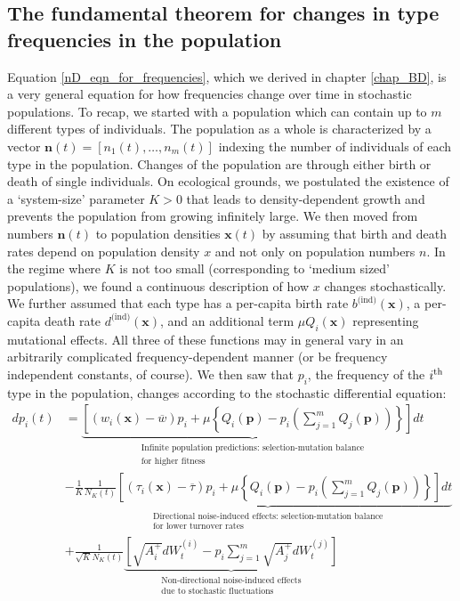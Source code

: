 \subsection{The fundamental theorem for changes in type frequencies in the population}\label{sec_fun_theorem_freq}
Equation \eqref{nD_eqn_for_frequencies}, which we derived in chapter \ref{chap_BD}, is a very general equation for how frequencies change over time in stochastic populations. To recap, we started with a population which can contain up to $m$ different types of individuals. The population as a whole is characterized by a vector $\mathbf{n}(t) = [n_1(t), \ldots, n_m(t)]$ indexing the number of individuals of each type in the population. Changes of the population are through either birth or death of single individuals. On ecological grounds, we postulated the existence of a `system-size' parameter $K>0$ that leads to density-dependent growth and prevents the population from growing infinitely large. We then moved from numbers $\mathbf{n}(t)$ to population densities $\mathbf{x}(t)$ by assuming that birth and death rates depend on population density $x$ and not only on population numbers $n$. In the regime where $K$ is not too small (corresponding to `medium sized' populations), we found a continuous description of how $x$ changes stochastically. We further assumed that each type has a per-capita birth rate $b^{\textrm{(ind)}}(\mathbf{x})$, a per-capita death rate $d^{\textrm{(ind)}}(\mathbf{x})$, and an additional term $\mu Q_{i}(\mathbf{x})$ representing mutational effects. All three of these functions may in general vary in an arbitrarily complicated frequency-dependent manner (or be frequency independent constants, of course). We then saw that $p_i$, the frequency of the $i\textsuperscript{th}$ type in the population, changes according to the stochastic differential equation:
\begin{equation}
\label{nD_stochastic_RM}
\begin{aligned}
dp_i(t) &= \underbrace{\left[(w_i(\mathbf{x}) - \overline{w})p_i + \mu\left\{Q_i(\mathbf{p}) - p_i\left(\sum\limits_{j=1}^{m}Q_j(\mathbf{p})\right)\right\}\right]dt}_{\substack{\text{Infinite population predictions: selection-mutation balance} \\ \text{for higher fitness}}}\\
&- \frac{1}{K}\underbrace{\frac{1}{N_{K}(t)}\left[(\tau_i(\mathbf{x}) - \overline{\tau})p_i + \mu\left\{Q_i(\mathbf{p}) - p_i\left(\sum\limits_{j=1}^{m}Q_j(\mathbf{p})\right)\right\}\right]dt}_{\substack{\text{Directional noise-induced effects: selection-mutation balance}\\\text{for lower turnover rates}}}\\
&+ \frac{1}{\sqrt{K}N_{K}(t)}\underbrace{\left[\sqrt{A^{+}_{i}}dW^{(i)}_t - p_i\sum\limits_{j=1}^{m}\sqrt{A^{+}_{j}}dW^{(j)}_t\right]}_{\substack{\text{Non-directional noise-induced effects}\\\text{due to stochastic fluctuations}}}
\end{aligned}
\end{equation}
